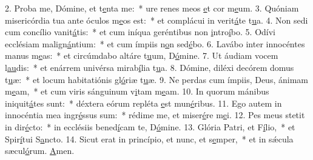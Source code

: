 2. Proba me, Dómine, et t\uline{e}nta me:~* ure renes meos \uline{e}t cor m\uline{e}um.
3. Quóniam misericórdia tua ante óculos m\uline{e}os est:~* et complácui in verit\uline{á}te t\uline{u}a.
4. Non sedi cum concílio vanit\uline{á}tis:~* et cum iníqua geréntibus non \uline{i}ntro\uline{í}bo.
5. Odívi ecclésiam malign\uline{á}ntium:~* et cum ímpiis n\uline{o}n sed\uline{é}bo.
6. Lavábo inter innocéntes manus m\uline{e}as:~* et circúmdabo altáre t\uline{u}um, D\uline{ó}mine.
7. Ut áudiam vocem l\uline{au}dis:~* et enárrem univérsa mirab\uline{í}lia t\uline{u}a.
8. Dómine, diléxi decórem domus t\uline{u}æ:~* et locum habitatiónis gl\uline{ó}riæ t\uline{u}æ.
9. Ne perdas cum ímpiis, Deus, ánimam m\uline{e}am,~* et cum viris sánguinum v\uline{i}tam m\uline{e}am.
10. In quorum mánibus iniquit\uline{á}tes sunt:~* déxtera eórum repléta \uline{e}st mun\uline{é}ribus.
11. Ego autem in innocéntia mea ingr\uline{é}ssus sum:~* rédime me, et miser\uline{é}re m\uline{e}i.
12. Pes meus stetit in dir\uline{é}cto:~* in ecclésiis bened\uline{í}cam te, D\uline{ó}mine.
13. Glória Patri, et F\uline{í}lio,~* et Spir\uline{í}tui S\uline{a}ncto.
14. Sicut erat in princípio, et nunc, et s\uline{e}mper,~* et in sǽcula sæcul\uline{ó}rum. \uline{A}men.
